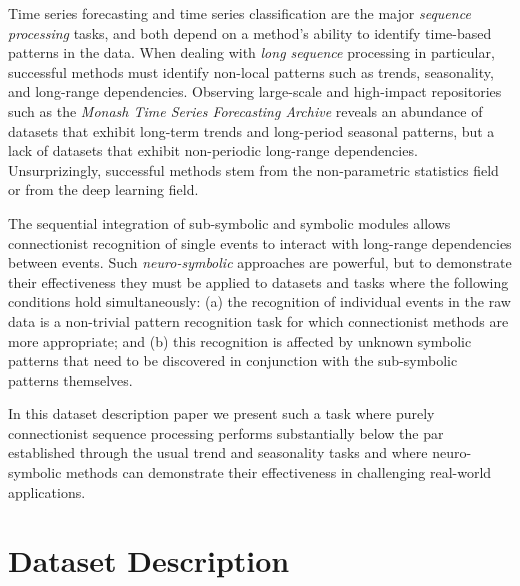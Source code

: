 \documentclass{ecai}
\begin{document}
Time series forecasting and time series classification are the major
\emph{sequence processing} tasks, and both depend on a method's
ability to identify time-based patterns in the data. When dealing
with \emph{long sequence} processing in particular, successful methods
must identify non-local patterns such as trends, seasonality, and
long-range dependencies. Observing large-scale and high-impact
repositories such as the 
\emph{Monash Time Series Forecasting Archive} \citep{godahewa-etal-2021}
reveals an abundance of datasets that exhibit long-term trends and
long-period seasonal patterns, but a lack of datasets that exhibit
non-periodic long-range dependencies. Unsurprizingly, successful
methods stem from the non-parametric statistics field or from the deep
learning field.

The sequential integration of sub-symbolic and symbolic modules allows
connectionist recognition of single events to interact with long-range
dependencies between events. Such \emph{neuro-symbolic} approaches are
powerful, but to demonstrate their effectiveness they must be applied
to datasets and tasks where the following conditions hold simultaneously:
(a) the recognition of individual events in the raw data is a
non-trivial pattern recognition task for which connectionist methods
are more appropriate; and (b) this recognition is affected by unknown
symbolic patterns that need to be discovered in conjunction with the
sub-symbolic patterns themselves.

In this dataset description paper we present such a task where purely
connectionist sequence processing performs substantially below the par
established through the usual trend and seasonality tasks and where
neuro-symbolic methods can demonstrate their effectiveness in
challenging real-world applications.


\section{Dataset Description}
\end{document}
